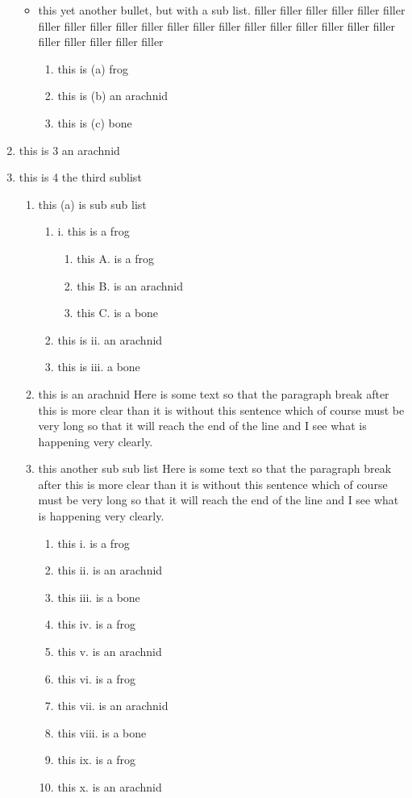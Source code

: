 \documentclass{article}
\begin{document}
\begin{enumerate}
\begin{itemize}
   \item this yet another bullet, but with a sub list. filler filler filler filler filler filler filler filler filler filler filler filler filler filler filler filler filler filler filler filler filler filler filler filler filler 
      \begin{enumerate}
      \item this is (a) frog
      \item this is (b) an arachnid
      \item this is (c) bone
      \end{enumerate}
   \end{itemize}
\item this is 3 an arachnid
\item this is 4 the third sublist
   \begin{enumerate}
   \item this (a) is sub sub list
      \begin{enumerate}
      \item  i. this is a frog
          \begin{enumerate}
          \item this A. is a frog
          \item this B. is an arachnid
          \item this C. is a bone
          \end{enumerate}
      \item this is ii. an arachnid
      \item this is iii. a bone
      \end{enumerate}
   \item this is an arachnid Here is some text so that the paragraph break after this
is more clear than it is without this sentence which of
course must be very long so that it will reach the end of
the line and I see what is happening very clearly.

   \item this another sub sub list Here is some text so that the paragraph break after this
is more clear than it is without this sentence which of
course must be very long so that it will reach the end of
the line and I see what is happening very clearly.

      \begin{enumerate}
      \item this i. is a frog
      \item this ii. is an arachnid
      \item this iii. is a bone
      \item this iv. is a frog
      \item this v. is an arachnid
      \item this vi. is a frog
      \item this vii. is an arachnid
      \item this viii. is a bone
      \item this ix. is a frog
      \item this x. is an arachnid
      \end{enumerate}
   \end{enumerate}
\end{enumerate}
\end{document}
